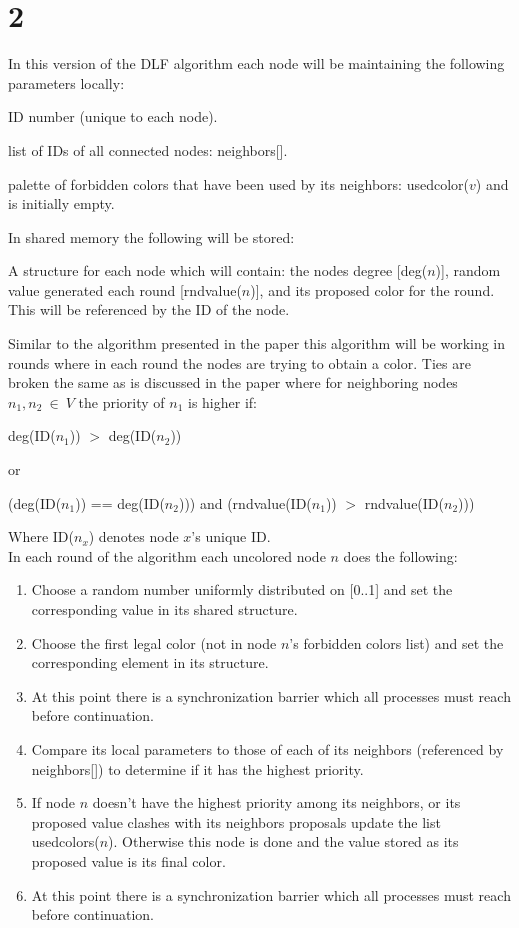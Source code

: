 \documentclass[10pt]{report}
\begin{document}
\section{2}
In this version of the DLF algorithm each node will be maintaining the
following parameters locally:
\begin{list}{-}{}
  \item ID number (unique to each node).
  \item list of IDs of all connected nodes: neighbors[].
  \item palette of forbidden colors that have been used by its
    neighbors: usedcolor($v$) and is initially empty.
\end{list}
In shared memory the following will be stored:
\begin{list}{-}{}
  \item A structure for each node which will contain: the nodes
    degree [deg($n$)], random value generated each round [rndvalue($n$)],
    and its proposed color for the round. This will be referenced by
    the ID of the node.
\end{list}
Similar to the algorithm presented in the paper this algorithm will be
working in rounds where in each round the nodes are trying to obtain a
color. Ties are broken the same as is discussed in the paper where for
neighboring nodes $n_{1},n_{2}\ \in\ V$ the priority of $n_{1}$ is
higher if:
\begin{center}
  {deg(ID($n_{1}$)) $>$ deg(ID($n_{2}$))}
\end{center}
or
\begin{center}
  {(deg(ID($n_{1}$)) == deg(ID($n_{2}$))) and
  (rndvalue(ID($n_{1}$)) $>$ rndvalue(ID($n_{2}$)))}
\end{center}
Where ID($n_x$) denotes node $x$'s unique ID.\\

In each round of the algorithm each uncolored node $n$ does the
following:
\begin{enumerate}
  \item Choose a random number uniformly distributed on [0..1] and set
    the corresponding value in its shared structure.
  \item Choose the first legal color (not in node $n$'s forbidden
    colors list) and set the corresponding element in its structure.
  \item At this point there is a synchronization barrier which all
    processes must reach before continuation.
  \item Compare its local parameters to those of each of its neighbors
    (referenced by neighbors[]) to
    determine if it has the highest priority.
  \item If node $n$ doesn't have the highest priority among its neighbors, or
    its proposed value clashes with its neighbors proposals update the
    list usedcolors($n$). Otherwise this node is done and the value
    stored as its proposed value is its final color.
  \item At this point there is a synchronization barrier which all
    processes must reach before continuation.
\end{enumerate}
\end{document}
